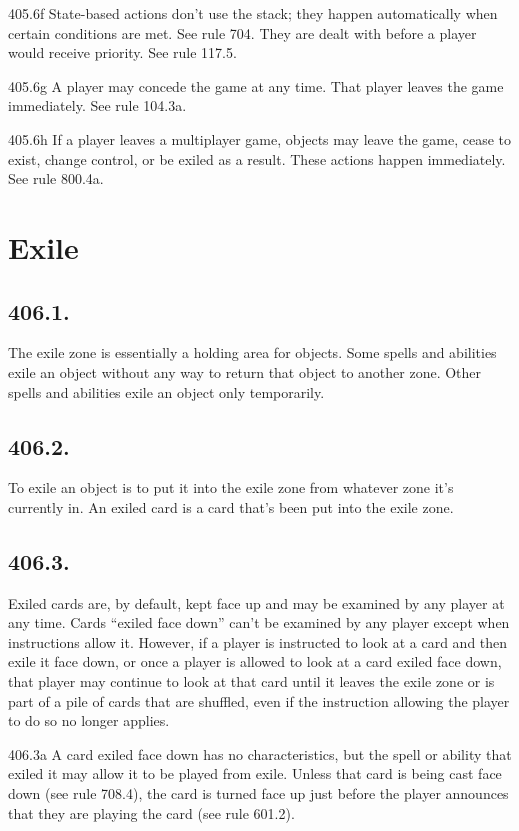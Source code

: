 405.6f State-based actions don’t use the stack; they happen automatically when certain conditions are met. See rule 704. They are dealt with before a player would receive priority. See rule 117.5.

405.6g A player may concede the game at any time. That player leaves the game immediately. See rule 104.3a.

405.6h If a player leaves a multiplayer game, objects may leave the game, cease to exist, change control, or be exiled as a result. These actions happen immediately. See rule 800.4a.

\section{Exile}
\subsection*{406.1.}
The exile zone is essentially a holding area for objects. Some spells and abilities exile an object without any way to return that object to another zone. Other spells and abilities exile an object only temporarily.

\subsection*{406.2.}
To exile an object is to put it into the exile zone from whatever zone it’s currently in. An exiled card is a card that’s been put into the exile zone.

\subsection*{406.3.}
Exiled cards are, by default, kept face up and may be examined by any player at any time. Cards “exiled face down” can’t be examined by any player except when instructions allow it. However, if a player is instructed to look at a card and then exile it face down, or once a player is allowed to look at a card exiled face down, that player may continue to look at that card until it leaves the exile zone or is part of a pile of cards that are shuffled, even if the instruction allowing the player to do so no longer applies.

406.3a A card exiled face down has no characteristics, but the spell or ability that exiled it may allow it to be played from exile. Unless that card is being cast face down (see rule 708.4), the card is turned face up just before the player announces that they are playing the card (see rule 601.2).

